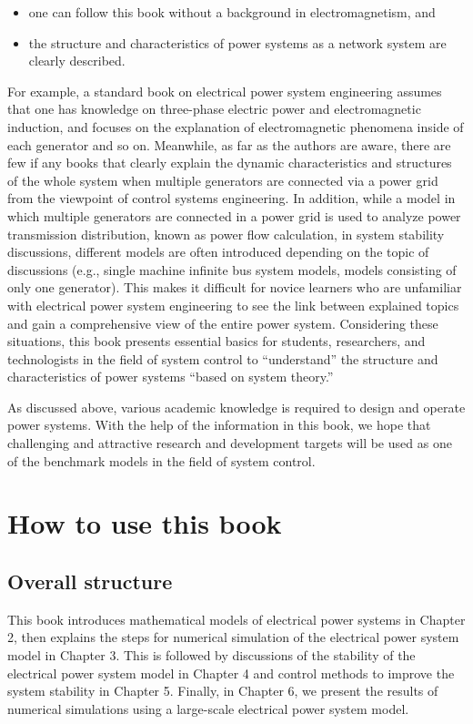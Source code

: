 \documentclass[graybox, envcountchap]{svmult}
\begin{document}
\begin{itemize}
	\item one can follow this book without a background in electromagnetism, and
	\item the structure and characteristics of power systems as a network system
	are clearly described.
\end{itemize}

For example, a standard book on electrical power system engineering assumes that
one has knowledge on three-phase electric power and electromagnetic induction,
and focuses on the explanation of electromagnetic phenomena inside of each
generator and so on. Meanwhile, as far as the authors are aware, there are few
if any books that clearly explain the dynamic characteristics and structures of
the whole system when multiple generators are connected via a power grid from
the viewpoint of control systems engineering.  In addition, while a model in
which multiple generators are connected in a power grid is used to analyze power
transmission distribution, known as power flow calculation, in system stability
discussions, different models are often introduced depending on the topic of
discussions (e.g., single machine infinite bus system models, models consisting
of only one generator).  This makes it difficult for novice learners who are
unfamiliar with electrical power system engineering to see the link between
explained topics and gain a comprehensive view of the entire power system.
Considering these situations, this book presents essential basics for students,
researchers, and technologists in the field of system control to “understand”
the structure and characteristics of power systems “based on system theory.”

As discussed above, various academic knowledge is required to design and operate
power systems.  With the help of the information in this book, we hope that
challenging and attractive research and development targets will be used as one
of the benchmark models in the field of system control.

\section{How to use this book}

\subsection{Overall structure}
This book introduces mathematical models of electrical power systems in Chapter
2, then explains the steps for numerical simulation of the electrical power
system model in Chapter 3.  This is followed by discussions of the stability of
the electrical power system model in Chapter 4 and control methods to improve
the system stability in Chapter 5.  Finally, in Chapter 6, we present the
results of numerical simulations using a large-scale electrical power system
model.
\end{document}
